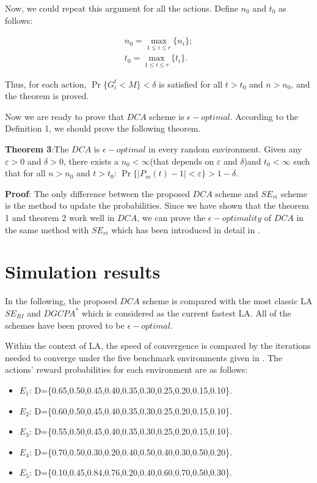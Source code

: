 Now, we could repeat this argument for all the actions. Define ${n_0}$ and ${t_0}$ as follows:

\[\begin{array}{l}
{n_0} = {\max _{1 \le i \le r}}\{ {n_i}\} ;\\
{t_0} = {\max _{1 \le i \le r}}\{ {t_i}\} .
\end{array}\]

Thus, for each action, $\Pr \{ G_i^t < M\}  < \delta$ is satisfied for all $t > {t_0}$ and $n > {n_0}$, and the theorem is proved.

Now we are ready to prove that $DCA$ scheme is $\epsilon-optimal$. According to the Definition 1, we should prove the following theorem.

\textbf{Theorem 3}:The $DCA$ is $\epsilon-optimal$ in every random environment. Given any $\varepsilon > 0$ and $\delta > 0$, there exists a ${n_0} < \infty $(that depends on $\varepsilon $ and $\delta $)and ${t_0} < \infty $ such that for all $n > {n_0}$ and $t > {t_0}$: $\Pr \{ |{P_m}(t) - 1| < \varepsilon \}  > 1 - \delta $.

\textbf{Proof}: The only difference between the proposed $DCA$ scheme and $SE_{ri}$ scheme is the method to update the probabilities. Since we have shown that the theorem 1 and theorem 2 work well in $DCA$, we can prove the $\epsilon-optimality$ of $DCA$ in the same method with $SE_{ri}$ which has been introduced in detail in \cite{papadimitriou2004new}.\\
\section{Simulation results}
\label{sec:4}

In the following, the proposed $DCA$ scheme is compared with the most classic LA $SE_{RI}$ and $DGCPA^{*}$ which is considered as the current fastest LA. All of the schemes have been proved to be  $\epsilon-optimal$.

Within the context of LA, the speed of convergence is compared by the iterations needed to converge under the five benchmark environments given in \cite{papadimitriou2004new}. The actions’ reward probabilities for each environment are as follows:

\begin{itemize}
  \item $E_1$: D=\{0.65,0.50,0.45,0.40,0.35,0.30,0.25,0.20,0.15,0.10\}.
  \item $E_2$: D=\{0.60,0.50,0.45,0.40,0.35,0.30,0.25,0.20,0.15,0.10\}.
  \item $E_3$: D=\{0.55,0.50,0.45,0.40,0.35,0.30,0.25,0.20,0.15,0.10\}.
  \item $E_4$: D=\{0.70,0.50,0.30,0.20,0.40,0.50,0.40,0.30,0.50,0.20\}.
  \item $E_5$: D=\{0.10,0.45,0.84,0.76,0.20,0.40,0.60,0.70,0.50,0.30\}.
\end{itemize}

